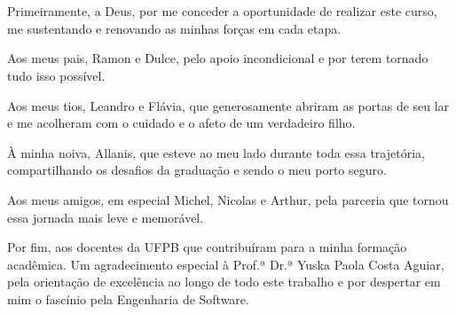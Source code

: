 \section*{} 

\noindent Primeiramente, a Deus, por me conceder a oportunidade de realizar este curso, me sustentando e renovando as minhas forças em cada etapa. 

\noindent Aos meus pais, Ramon e Dulce, pelo apoio incondicional e por terem tornado tudo isso possível. 

\noindent Aos meus tios, Leandro e Flávia, que generosamente abriram as portas de seu lar e me acolheram com o cuidado e o afeto de um verdadeiro filho. 

\noindent À minha noiva, Allanis, que esteve ao meu lado durante toda essa trajetória, compartilhando os desafios da graduação e sendo o meu porto seguro. 

\noindent Aos meus amigos, em especial Michel, Nicolas e Arthur, pela parceria que tornou essa jornada mais leve e memorável. 

\noindent Por fim, aos docentes da UFPB que contribuíram para a minha formação acadêmica. Um agradecimento especial à Prof.ª Dr.ª Yuska Paola Costa Aguiar, pela orientação de excelência ao longo de todo este trabalho e por despertar em mim o fascínio pela Engenharia de Software.


